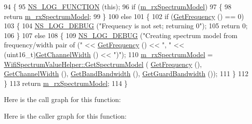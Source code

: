 \begin{DoxyCode}
94 \{
95   \hyperlink{log-macros-disabled_8h_a90b90d5bad1f39cb1b64923ea94c0761}{NS\_LOG\_FUNCTION} (\textcolor{keyword}{this});
96   \textcolor{keywordflow}{if} (\hyperlink{classns3_1_1SpectrumWifiPhy_ad3fd35b0100f628c126092dde86a939c}{m\_rxSpectrumModel})
97     \{
98       \textcolor{keywordflow}{return} \hyperlink{classns3_1_1SpectrumWifiPhy_ad3fd35b0100f628c126092dde86a939c}{m\_rxSpectrumModel};
99     \}
100   \textcolor{keywordflow}{else}
101     \{
102       \textcolor{keywordflow}{if} (\hyperlink{classns3_1_1WifiPhy_ad2508d94faf22d690d6b8b4367934fd1}{GetFrequency} () == 0)
103         \{
104           \hyperlink{group__logging_ga413f1886406d49f59a6a0a89b77b4d0a}{NS\_LOG\_DEBUG} (\textcolor{stringliteral}{"Frequency is not set; returning 0"});
105           \textcolor{keywordflow}{return} 0;
106         \}
107       \textcolor{keywordflow}{else}
108         \{
109           \hyperlink{group__logging_ga413f1886406d49f59a6a0a89b77b4d0a}{NS\_LOG\_DEBUG} (\textcolor{stringliteral}{"Creating spectrum model from frequency/width pair of ("} << 
      \hyperlink{classns3_1_1WifiPhy_ad2508d94faf22d690d6b8b4367934fd1}{GetFrequency} () << \textcolor{stringliteral}{", "} << (uint16\_t)\hyperlink{classns3_1_1WifiPhy_a4a5d5009b3b3308f2baeed42a2007189}{GetChannelWidth} () << \textcolor{stringliteral}{")"});
110           \hyperlink{classns3_1_1SpectrumWifiPhy_ad3fd35b0100f628c126092dde86a939c}{m\_rxSpectrumModel} = 
      \hyperlink{classns3_1_1WifiSpectrumValueHelper_a09b58fb2741ff1a78ae6d952ad08b1bb}{WifiSpectrumValueHelper::GetSpectrumModel} (
      \hyperlink{classns3_1_1WifiPhy_ad2508d94faf22d690d6b8b4367934fd1}{GetFrequency} (), \hyperlink{classns3_1_1WifiPhy_a4a5d5009b3b3308f2baeed42a2007189}{GetChannelWidth} (), \hyperlink{classns3_1_1SpectrumWifiPhy_a2028d03c5fa0c7683ea23c6ada450d84}{GetBandBandwidth} (), 
      \hyperlink{classns3_1_1SpectrumWifiPhy_a5a24b5d646d3968cf4678a814156edfe}{GetGuardBandwidth} ());
111         \}
112     \}
113   \textcolor{keywordflow}{return} \hyperlink{classns3_1_1SpectrumWifiPhy_ad3fd35b0100f628c126092dde86a939c}{m\_rxSpectrumModel};
114 \}
\end{DoxyCode}


Here is the call graph for this function\+:




Here is the caller graph for this function\+:


